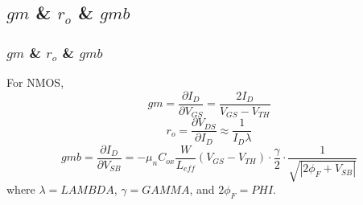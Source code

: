 \documentclass{beamer}
\begin{document}
\subsection{$gm$ \& $r_o$ \& $gmb$} 
\begin{frame}
    \frametitle{$gm$ \& $r_o$ \& $gmb$}
    For NMOS, 
    \begin{equation*}
            \boxed{gm = \frac{\partial I_D}{\partial V_{GS}} = \frac{2I_D}{V_{GS}-V_{TH}}}
    \end{equation*}
    \begin{equation*}
            \boxed{r_o = \frac{\partial V_{DS}}{\partial I_D} \approx \frac{1}{I_D\lambda}}
    \end{equation*}
    \begin{equation*}
            \boxed{gmb = \frac{\partial I_D}{\partial V_{SB}} = -\mu_n C_{ox} \frac{W}{L_{eff}}(V_{GS}-V_{TH})\cdot \frac{\gamma}{2}\cdot \frac{1}{\sqrt{|2\phi_F+V_{SB}|}}}
    \end{equation*}
    where $\lambda = LAMBDA$, $\gamma = GAMMA$, and $2\phi_F = PHI$. 
\end{frame}
\end{document}
